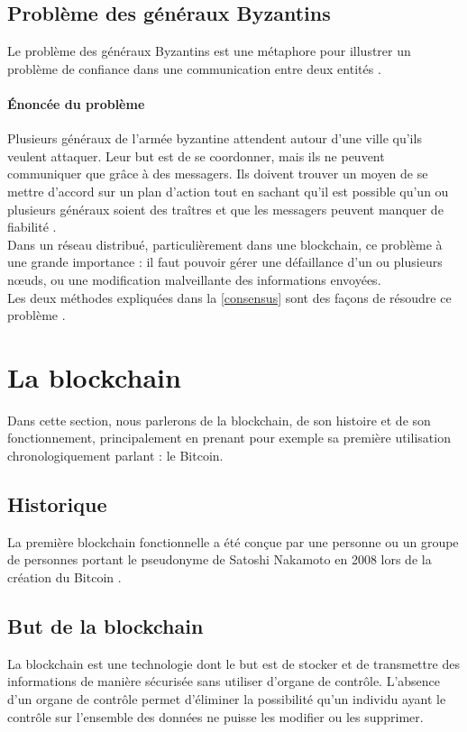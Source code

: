 \documentclass[10pt,a4paper,twoside]{article}
\numberwithin{equation}{section}
\begin{document}
	\subsection{Problème des généraux Byzantins} \label{BFT}
		Le problème des généraux Byzantins est une métaphore pour illustrer un problème de confiance dans une communication entre deux entités \cite{wiki:BFT}.
		\paragraph{Énoncée du problème}
			Plusieurs généraux de l'armée byzantine attendent autour d'une ville qu'ils veulent attaquer. Leur but est de se coordonner, mais ils ne peuvent communiquer que grâce à des messagers. Ils doivent trouver un moyen de se mettre d'accord sur un plan d'action tout en sachant qu'il est possible qu'un ou plusieurs généraux soient des traîtres et que les messagers peuvent manquer de fiabilité \cite{wiki:BFT}.\\
			
		Dans un réseau distribué, particulièrement dans une blockchain, ce problème à une grande importance : il faut pouvoir gérer une défaillance d'un ou plusieurs n\oe uds, ou une modification malveillante des informations envoyées.\\
		
		Les deux méthodes expliquées dans la \autoref{consensus} sont des façons de résoudre ce problème \cite{wiki:BFT}.
		
		

\section{La blockchain} \label{blockchain}
	Dans cette section, nous parlerons de la blockchain, de son histoire et de son fonctionnement, principalement en prenant pour exemple sa première utilisation chronologiquement parlant : le Bitcoin.

	\subsection{Historique} \label{historique_blockchain}
		La première blockchain fonctionnelle a été conçue par une personne ou un groupe de personnes portant le pseudonyme de Satoshi Nakamoto en 2008 lors de la création du Bitcoin \cite{wiki:blockchain}.
		
	\subsection{But de la blockchain} \label{goal_blockchain}
		La blockchain est une technologie dont le but est de stocker et de transmettre des informations de manière sécurisée sans utiliser d'organe de contrôle. L'absence d'un organe de contrôle permet d'éliminer la possibilité qu'un individu ayant le contrôle sur l'ensemble des données ne puisse les modifier ou les supprimer.
		
\end{document}
